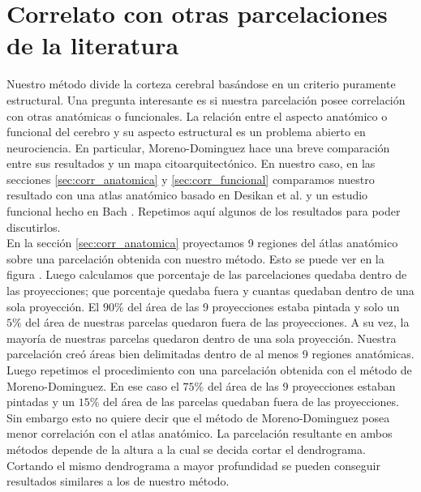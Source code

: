 \section{Correlato con otras parcelaciones de la literatura}

Nuestro m\'etodo divide la corteza cerebral bas\'andose en un criterio
puramente estructural. Una pregunta interesante es si nuestra parcelaci\'on
posee correlaci\'on con otras anat\'omicas o funcionales. La relaci\'on
entre el aspecto anat\'omico o funcional del cerebro y su aspecto
estructural es un problema abierto en neurociencia. En particular, 
Moreno-Dominguez \cite{Moreno-Dominguez2014} hace 
una breve comparaci\'on entre sus resultados y un mapa 
citoarquitect\'onico. En nuestro caso, en las secciones 
\ref{sec:corr_anatomica} y \ref{sec:corr_funcional} comparamos nuestro 
resultado con una atlas anat\'omico basado en Desikan et al. 
\cite{Desikan2006} y un estudio funcional hecho en Bach \cite{Barch2013}.
Repetimos aqu\'i algunos de los resultados para poder discutirlos. \\

En la secci\'on \ref{sec:corr_anatomica} proyectamos 9 regiones del \'atlas
anat\'omico sobre una parcelaci\'on obtenida con nuestro m\'etodo. Esto
se puede ver en la figura \label{fig:an2pa2}. Luego
calculamos que porcentaje de las parcelaciones quedaba dentro de las
proyecciones; que porcentaje quedaba fuera y cuantas quedaban dentro de
una sola proyecci\'on. El $90\%$ del \'area de las 9 proyecciones estaba
pintada y solo un $5\%$ del \'area de nuestras parcelas quedaron fuera de
las proyecciones. A su vez, la mayor\'ia de nuestras parcelas quedaron 
dentro de una sola proyecci\'on. Nuestra parcelaci\'on cre\'o \'areas bien
delimitadas dentro de al menos 9 regiones anat\'omicas. \\

Luego repetimos el procedimiento con una parcelaci\'on obtenida con el 
m\'etodo de Moreno-Dominguez. 
En ese caso el $75\%$ del \'area de las 9 proyecciones estaban pintadas y 
un $15\%$ del \'area de las parcelas quedaban fuera de las proyecciones. 
Sin embargo esto no quiere decir que el m\'etodo de Moreno-Dominguez 
posea menor correlaci\'on con el atlas anat\'omico. La parcelaci\'on 
resultante en ambos m\'etodos depende de la altura a la cual se decida 
cortar el dendrograma. Cortando el mismo dendrograma a mayor profundidad
se pueden conseguir resultados similares a los de nuestro m\'etodo.\\

